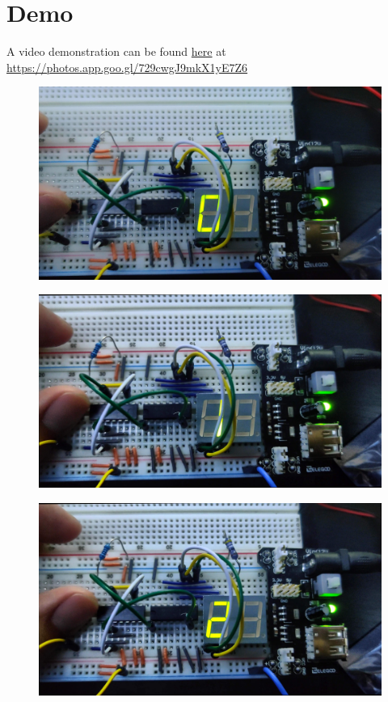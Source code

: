 \documentclass{article}
\begin{document}
\newpage



\newpage

\section*{Demo}
A video demonstration can be found \href{https://photos.app.goo.gl/729cwgJ9mkX1yE7Z6}{here} at \url{https://photos.app.goo.gl/729cwgJ9mkX1yE7Z6}
\begin{figure}[ht!]
  \centering
  \includegraphics[width=\textwidth]{ECE2300L_Lab11_0.jpg}
\end{figure}
\begin{figure}[ht!]
  \centering
  \includegraphics[width=\textwidth]{ECE2300L_Lab11_1.jpg}
\end{figure}
\begin{figure}[ht!]
  \centering
  \includegraphics[width=\textwidth]{ECE2300L_Lab11_2.jpg}
\end{figure}
\end{document}
